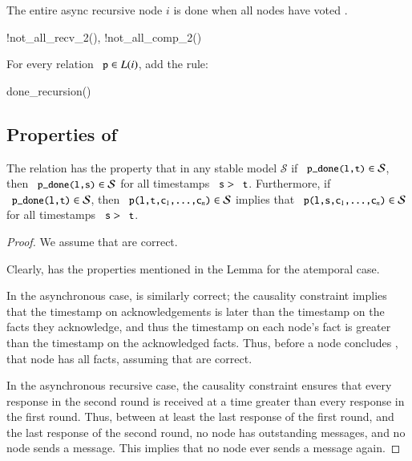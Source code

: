 The entire async recursive node $i$ is done when all nodes have voted .

\begin{Drules}
      {!not_all_recv_2(), !not_all_comp_2()}
\end{Drules}

For every relation $\dedalus{p} \in L(i)$, add the rule:

\begin{Drules}
      {done_recursion()}
\end{Drules}

\subsection{Properties of \plang}

\begin{lemma}
\label{lem:plang-done-right}
The relation  has the property that in any stable model $\mathcal{S}$ if $\dedalus{p_done(l,t)} \in \mathcal{S}$,  then $\dedalus{p_done(l,s)} \in \mathcal{S}$ for all timestamps $\dedalus{s} > \dedalus{t}$.  Furthermore, if $\dedalus{p_done(l,t)} \in \mathcal{S}$, then $\dedalus{p(l,t,c\sub{1},\ldots,c\sub{n})} \in \mathcal{S}$ implies that $\dedalus{p(l,s,c\sub{1},\ldots,c\sub{n})} \in \mathcal{S}$ for all timestamps $\dedalus{s} > \dedalus{t}$.
\end{lemma}
\begin{proof}
We assume that  are correct.

Clearly,  has the properties mentioned in the Lemma for the atemporal case.

In the asynchronous case,  is similarly correct; the causality constraint implies that the timestamp on acknowledgements is later than the timestamp on the facts they acknowledge, and thus the timestamp on each node's  fact is greater than the timestamp on the acknowledged facts.  Thus, before a node concludes , that node has all facts, assuming that  are correct.

In the asynchronous recursive case, the causality constraint ensures that every response in the second round is received at a time greater than every response in the first round.  Thus, between at least the last response of the first round, and the last response of the second round, no node has outstanding messages, and no node sends a message.  This implies that no node ever sends a message again.
\end{proof}

